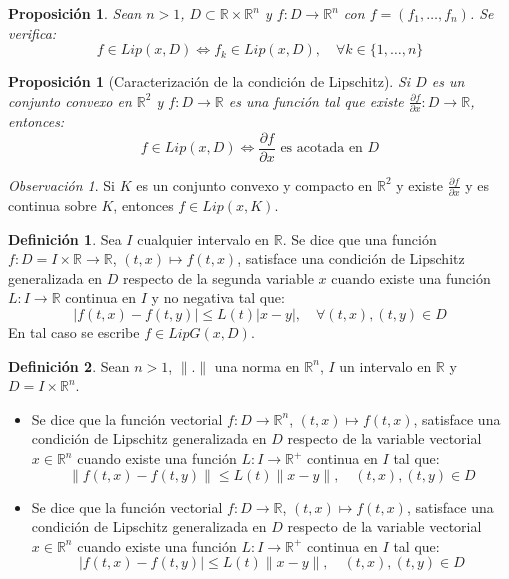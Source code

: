 \documentclass{report}
\newtheorem{proposition}[theorem]{Proposición}
\theoremstyle{remark}
\newtheorem*{remark}{Observación}
\theoremstyle{remark}
\theoremstyle{remark}
\theoremstyle{definition}
\newtheorem{definition}{Definición}[chapter]
\theoremstyle{definition}
\theoremstyle{definition}
\begin{document}
\begin{proposition}
    Sean $n > 1$, $D \subset \mathbb{R} \times \mathbb{R}^n$ y $f: D \to \mathbb{R}^n$ con $f = (f_1, \dots, f_n)$.
    Se verifica:
    $$f \in Lip(x, D) \Leftrightarrow f_k \in Lip(x, D), \quad \forall k \in \{1, \dots, n\}$$
\end{proposition}

\begin{proposition}[Caracterización de la condición de Lipschitz]
    Si $D$ es un conjunto convexo en $\mathbb{R}^2$ y $f: D \to \mathbb{R}$ es una función tal que existe $\frac{\partial f}{\partial x}: D \to \mathbb{R}$, entonces:
    $$f \in Lip(x, D) \Leftrightarrow \frac{\partial f}{\partial x} \text{ es acotada en } D$$
\end{proposition}

\begin{remark}
    Si $K$ es un conjunto convexo y compacto en $\mathbb{R}^2$ y existe $\frac{\partial f}{\partial x}$ y es continua sobre $K$, entonces $f \in Lip(x, K)$.
\end{remark}

\begin{definition}
    Sea $I$ cualquier intervalo en $\mathbb{R}$.
    Se dice que una función $f: D = I \times \mathbb{R} \to \mathbb{R}$, $(t, x) \mapsto f(t, x)$, satisface una condición de Lipschitz generalizada en $D$ respecto de la segunda variable $x$ cuando existe una función $L: I \to \mathbb{R}$ continua en $I$ y no negativa tal que:
    $$|f(t, x) - f(t, y)| \leq L(t) |x-y|, \quad \forall (t, x), (t, y) \in D$$
    En tal caso se escribe $f \in LipG(x, D)$.
\end{definition}

\begin{definition}
    Sean $n > 1$, $\|.\|$ una norma en $\mathbb{R}^n$, $I$ un intervalo en $\mathbb{R}$ y $D = I \times \mathbb{R}^n$.
    \begin{itemize}
        \item Se dice que la función vectorial $f: D \to \mathbb{R}^n$, $(t, x) \mapsto f(t, x)$, satisface una condición de Lipschitz generalizada en $D$ respecto de la variable vectorial $x \in \mathbb{R}^n$ cuando existe una función $L: I \to \mathbb{R}^+$ continua en $I$ tal que:
              $$\|f(t, x) - f(t, y)\| \leq L(t)\|x-y\|, \quad (t, x), (t, y) \in D$$
        \item Se dice que la función vectorial $f: D \to \mathbb{R}$, $(t, x) \mapsto f(t, x)$, satisface una condición de Lipschitz generalizada en $D$ respecto de la variable vectorial $x \in \mathbb{R}^n$ cuando existe una función $L: I \to \mathbb{R}^+$ continua en $I$ tal que:
              $$|f(t, x) - f(t, y)| \leq L(t)\|x-y\|, \quad (t, x), (t, y) \in D$$
    \end{itemize}
\end{definition}
\end{document}
